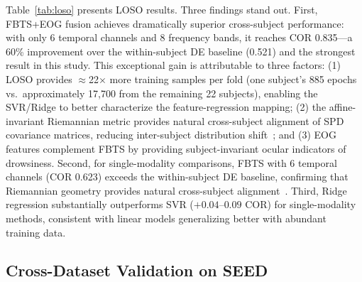 \documentclass{iopjournal}
\begin{document}
Table~\ref{tab:loso} presents LOSO results. Three findings stand out. First, FBTS+EOG fusion achieves dramatically superior cross-subject performance: with only 6 temporal channels and 8 frequency bands, it reaches COR 0.835---a 60\% improvement over the within-subject DE baseline (0.521) and the strongest result in this study. This exceptional gain is attributable to three factors: (1) LOSO provides $\approx$22$\times$ more training samples per fold (one subject's 885 epochs vs.\ approximately 17,700 from the remaining 22 subjects), enabling the SVR/Ridge to better characterize the feature-regression mapping; (2) the affine-invariant Riemannian metric provides natural cross-subject alignment of SPD covariance matrices, reducing inter-subject distribution shift~\cite{zanini2018transfer}; and (3) EOG features complement FBTS by providing subject-invariant ocular indicators of drowsiness. Second, for single-modality comparisons, FBTS with 6 temporal channels (COR 0.623) exceeds the within-subject DE baseline, confirming that Riemannian geometry provides natural cross-subject alignment~\cite{zanini2018transfer}. Third, Ridge regression substantially outperforms SVR ($+0.04$--$0.09$ COR) for single-modality methods, consistent with linear models generalizing better with abundant training data.

\subsection{Cross-Dataset Validation on SEED}
\end{document}
